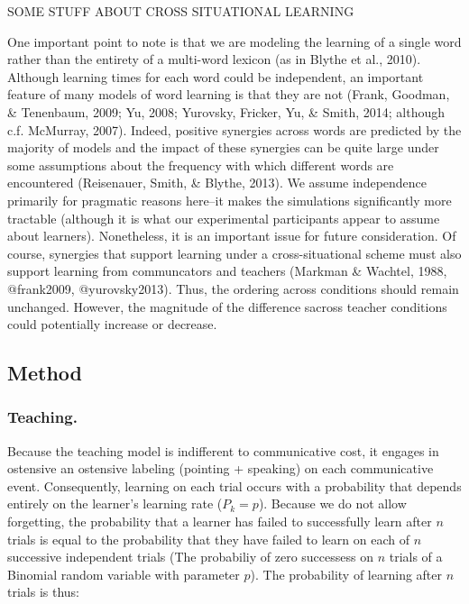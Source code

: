 \documentclass[english,,man,floatsintext]{apa6}
\begin{document}
SOME STUFF ABOUT CROSS SITUATIONAL LEARNING

One important point to note is that we are modeling the learning of a single word rather than the entirety of a multi-word lexicon (as in Blythe et al., 2010). Although learning times for each word could be independent, an important feature of many models of word learning is that they are not (Frank, Goodman, \& Tenenbaum, 2009; Yu, 2008; Yurovsky, Fricker, Yu, \& Smith, 2014; although c.f. McMurray, 2007). Indeed, positive synergies across words are predicted by the majority of models and the impact of these synergies can be quite large under some assumptions about the frequency with which different words are encountered (Reisenauer, Smith, \& Blythe, 2013). We assume independence primarily for pragmatic reasons here--it makes the simulations significantly more tractable (although it is what our experimental participants appear to assume about learners). Nonetheless, it is an important issue for future consideration. Of course, synergies that support learning under a cross-situational scheme must also support learning from communcators and teachers (Markman \& Wachtel, 1988, @frank2009, @yurovsky2013). Thus, the ordering across conditions should remain unchanged. However, the magnitude of the difference sacross teacher conditions could potentially increase or decrease.

\hypertarget{method-1}{%
\subsection{Method}\label{method-1}}

\hypertarget{teaching.}{%
\subsubsection{Teaching.}\label{teaching.}}

Because the teaching model is indifferent to communicative cost, it engages in ostensive an ostensive labeling (pointing + speaking) on each communicative event. Consequently, learning on each trial occurs with a probability that depends entirely on the learner's learning rate (\(P_{k}=p\)). Because we do not allow forgetting, the probability that a learner has failed to successfully learn after \(n\) trials is equal to the probability that they have failed to learn on each of \(n\) successive independent trials (The probabiliy of zero successess on \(n\) trials of a Binomial random variable with parameter \(p\)). The probability of learning after \(n\) trials is thus:
\end{document}
